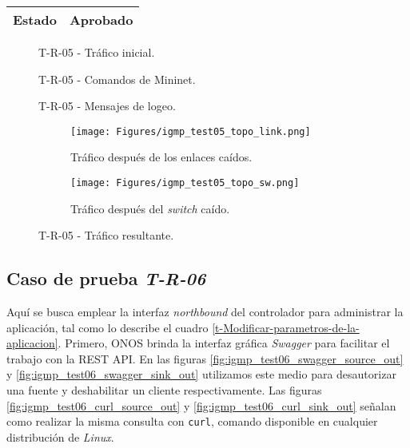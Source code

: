 \begin{table}[H]
{\begin{tabular}{|c|c|}
\rowcolor[HTML]{FFFFFF} 
\textbf{Estado}                               & Aprobado                                                                                                                                             \\ \hline
\end{tabular}%
}
\end{table}

\begin{figure}[H]
	\centering 
	\caption[T-R-05 - Tráfico inicial]{T-R-05 - Tráfico inicial.}
	\label{fig:igmp_test05_topo_init}
\end{figure}

\begin{figure}[H]
	\centering 
	\caption[T-R-05 - Comandos de Mininet]{T-R-05 - Comandos de Mininet.}
	\label{fig:igmp_test05_cmd_mininet}
\end{figure}

\begin{figure}[H]
	\centering 
	\caption[T-R-05 - Mensajes de logeo]{T-R-05 - Mensajes de logeo.}
	\label{fig:igmp_test05_log}
\end{figure}

\begin{figure}[H]    
    \begin{subfigure}[b]{0.5\textwidth}
        \texttt{[image: Figures/igmp\_test05\_topo\_link.png]}
        \caption{Tráfico después de los enlaces caídos.}
        \label{fig:igmp_test05_topo_link}
    \end{subfigure}
    \begin{subfigure}[b]{0.5\textwidth}
        \texttt{[image: Figures/igmp\_test05\_topo\_sw.png]}
        \caption{Tráfico después del \textit{switch} caído.}
        \label{fig:igmp_test05_topo_sw}
    \end{subfigure}
    \caption[T-R-05 - Tráfico resultante]{T-R-05 - Tráfico resultante.}
\end{figure}

\subsection*{Caso de prueba \textit{T-R-06}}

Aquí se busca emplear la interfaz \textit{northbound} del controlador para administrar la aplicación, tal como lo describe el cuadro \ref{t-Modificar-parametros-de-la-aplicacion}. Primero, ONOS brinda la interfaz gráfica \textit{Swagger} para facilitar el trabajo con la REST API. En las figuras \ref{fig:igmp_test06_swagger_source_out} y \ref{fig:igmp_test06_swagger_sink_out} utilizamos este medio para desautorizar una fuente y deshabilitar un cliente respectivamente. Las figuras \ref{fig:igmp_test06_curl_source_out} y \ref{fig:igmp_test06_curl_sink_out} señalan como realizar la misma consulta con \texttt{curl}, comando disponible en cualquier distribución de \textit{Linux}. 

